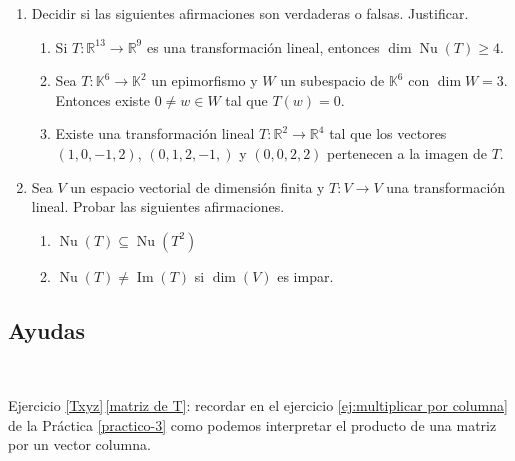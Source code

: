 \begin{enumerate}[resume, topsep=5pt,itemsep=.4cm]
 
\item Decidir si las siguientes afirmaciones son verdaderas o falsas. Justificar.
\begin{enumerate}
    \item  Si $T : \mathbb R^{13} \to \mathbb R^9$ es una transformación lineal, entonces $\dim \operatorname{Nu}(T) \geq  4$.
    \item Sea $T:\mathbb{K}^{6}\longrightarrow\mathbb{K}^2$ un epimorfismo y $W$ un subespacio de $\mathbb{K}^{6}$ con $\dim W=3$. Entonces existe $0\neq w\in W$ tal que $T(w)=0$.
    \item Existe una transformación lineal $T : \mathbb R^2 \to \mathbb R^4$ tal que los vectores $(1, 0, -1, 2)$, $(0, 1, 2,-1,)$ y $(0, 0, 2, 2)$ pertenecen a la imagen de $T$.
\end{enumerate}

\item Sea $V$ un espacio vectorial de dimensión finita y $T:V\longrightarrow V$ una transformación lineal. Probar las siguientes afirmaciones.
    \begin{multicols}{2}
        \begin{enumerate}
            \item $\operatorname{Nu}(T)\subseteq\operatorname{Nu}(T^2)$
            \item\label{dimV impar} $\operatorname{Nu}(T)\neq\operatorname{Im}(T)$ si $\dim(V)$ es impar.
        \end{enumerate}
    \end{multicols}



\end{enumerate}

\subsection*{Ayudas}

\ 

    Ejercicio \ref{Txyz}\,\ref{matriz de T}: recordar en el ejercicio \ref{ej:multiplicar por columna} de la Práctica \ref{practico-3} como podemos interpretar el producto de una matriz por un vector columna. 



